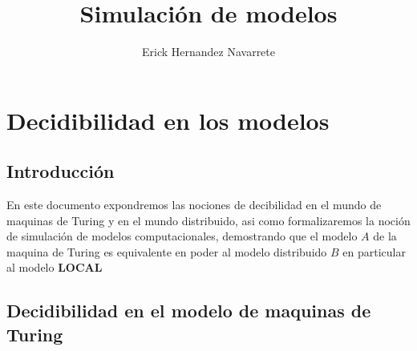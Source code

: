 \documentclass[10pt]{report}
\author{Erick Hernandez Navarrete}
\title{Simulación de modelos}
\begin{document}
    \maketitle
    \tableofcontents{}
    \chapter{Decidibilidad en los modelos}\label{ch:decidibilidad-en-los-modelos}
    \section{Introducción}\label{sec:introducción}
    En este documento expondremos las nociones de decibilidad
    en el mundo de maquinas de Turing y en el mundo distribuido,
    asi como formalizaremos la noción de simulación de modelos
    computacionales, demostrando que el modelo $A$ de  la maquina de
    Turing es equivalente en poder al modelo distribuido $B$ en particular al modelo \textbf{LOCAL}

    \section{Decidibilidad en el modelo de maquinas de Turing}\label{sec:decidibilidasd-en-el-modelo-de-maquinas-de-turing}
\end{document}

